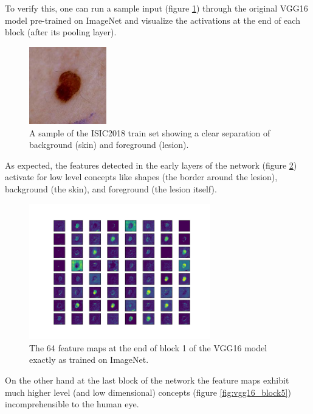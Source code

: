 To verify this, one can run a sample input (figure \ref{fig:sample_input}) through the original VGG16 model pre-trained on ImageNet and visualize the activations at the end of each block (after its pooling layer).

\begin{figure}[ht]
    \centering
    \includegraphics[width=0.3\textwidth]{figs/sample_input.jpg}
    \caption{A sample of the ISIC2018 train set showing a clear separation of background (skin) and foreground (lesion).}
    \label{fig:sample_input}
\end{figure}

As expected, the features detected in the early layers of the network (figure \ref{fig:vgg16_block1}) activate for low level concepts like shapes (the border around the lesion), background (the skin), and foreground (the lesion itself).

\begin{figure}[ht]
    \centering
    \includegraphics[width=0.7\textwidth]{figs/vgg16_block1.png}
    \caption{The 64 feature maps at the end of block 1 of the VGG16 model exactly as trained on ImageNet.}
    \label{fig:vgg16_block1}
\end{figure}

On the other hand at the last block of the network the feature maps exhibit much higher level (and low dimensional) concepts (figure \ref{fig:vgg16_block5}) incomprehensible to the human eye.

